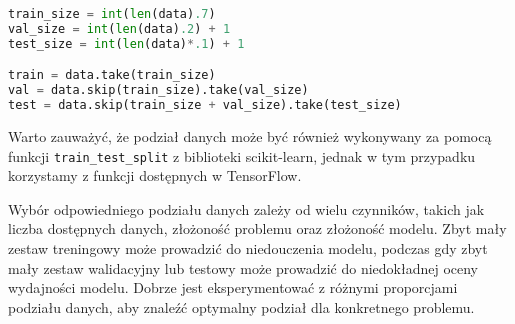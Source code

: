 \begin{lstlisting}[language=Python]
train_size = int(len(data).7)
val_size = int(len(data).2) + 1
test_size = int(len(data)*.1) + 1

train = data.take(train_size)
val = data.skip(train_size).take(val_size)
test = data.skip(train_size + val_size).take(test_size)
\end{lstlisting}

Warto zauważyć, że podział danych może być również wykonywany za pomocą funkcji \texttt{train\_test\_split} z biblioteki scikit-learn, jednak w tym przypadku korzystamy z funkcji dostępnych w TensorFlow.

Wybór odpowiedniego podziału danych zależy od wielu czynników, takich jak liczba dostępnych danych, złożoność problemu oraz złożoność modelu. Zbyt mały zestaw treningowy może prowadzić do niedouczenia modelu, podczas gdy zbyt mały zestaw walidacyjny lub testowy może prowadzić do niedokładnej oceny wydajności modelu. Dobrze jest eksperymentować z różnymi proporcjami podziału danych, aby znaleźć optymalny podział dla konkretnego problemu.